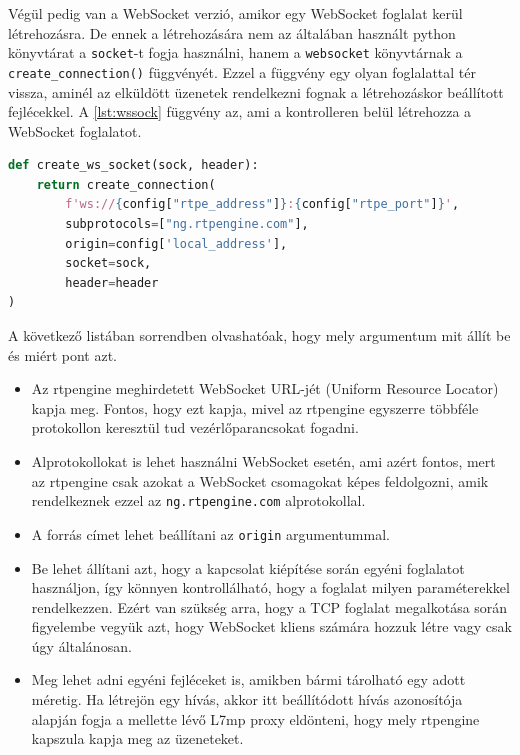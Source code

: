 Végül pedig van a WebSocket verzió, amikor egy WebSocket foglalat kerül létrehozásra.
De ennek a létrehozására nem az általában használt python könyvtárat a \texttt{socket}-t
fogja használni, hanem a \texttt{websocket} \cite{websocket} könyvtárnak a 
\texttt{create\_connection()} függvényét. Ezzel a függvény egy olyan foglalattal tér 
vissza, aminél az elküldött üzenetek rendelkezni fognak a létrehozáskor beállított 
fejlécekkel. A \ref{lst:wssock} függvény az, ami a kontrolleren belül létrehozza a 
WebSocket foglalatot. 

\begin{lstlisting}[language=python, caption=WebSocket foglalat létrehozása, label=lst:wssock]
def create_ws_socket(sock, header):
    return create_connection(
        f'ws://{config["rtpe_address"]}:{config["rtpe_port"]}',
        subprotocols=["ng.rtpengine.com"],
        origin=config['local_address'],
        socket=sock,
        header=header
)
\end{lstlisting}

A következő listában sorrendben olvashatóak, hogy mely argumentum mit állít be és miért
pont azt.

\begin{itemize}
	\item Az rtpengine meghirdetett WebSocket URL-jét (Uniform Resource Locator) kapja 
	meg. Fontos, hogy ezt kapja, mivel az rtpengine egyszerre többféle protokollon 
	keresztül tud vezérlőparancsokat fogadni.
	\item Alprotokollokat is lehet használni WebSocket esetén, ami azért fontos, mert
	az rtpengine csak azokat a WebSocket csomagokat képes feldolgozni, amik rendelkeznek
	ezzel az \texttt{ng.rtpengine.com} alprotokollal.
	\item A forrás címet lehet beállítani az \texttt{origin} argumentummal. 
	\item Be lehet állítani azt, hogy a kapcsolat kiépítése során egyéni foglalatot
	használjon, így könnyen kontrollálható, hogy a foglalat milyen paraméterekkel 
	rendelkezzen. Ezért van szükség arra, hogy a TCP foglalat megalkotása során
	figyelembe vegyük azt, hogy WebSocket kliens számára hozzuk létre vagy csak úgy
	általánosan.
	\item Meg lehet adni egyéni fejléceket is, amikben bármi tárolható egy adott
	méretig. Ha létrejön egy hívás, akkor itt beállítódott hívás azonosítója alapján
	fogja a mellette lévő L7mp proxy eldönteni, hogy mely rtpengine kapszula kapja
	meg az üzeneteket.
\end{itemize}


